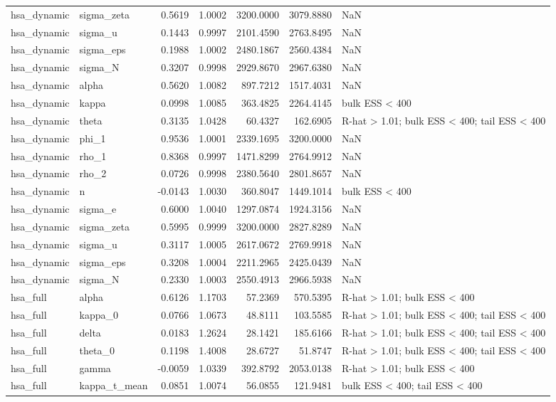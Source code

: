 \begin{tabular}{llrrrrl}
hsa\_dynamic & sigma\_zeta & 0.5619 & 1.0002 & 3200.0000 & 3079.8880 & NaN \\
hsa\_dynamic & sigma\_u & 0.1443 & 0.9997 & 2101.4590 & 2763.8495 & NaN \\
hsa\_dynamic & sigma\_eps & 0.1988 & 1.0002 & 2480.1867 & 2560.4384 & NaN \\
hsa\_dynamic & sigma\_N & 0.3207 & 0.9998 & 2929.8670 & 2967.6380 & NaN \\
hsa\_dynamic & alpha & 0.5620 & 1.0082 & 897.7212 & 1517.4031 & NaN \\
hsa\_dynamic & kappa & 0.0998 & 1.0085 & 363.4825 & 2264.4145 & bulk ESS < 400 \\
hsa\_dynamic & theta & 0.3135 & 1.0428 & 60.4327 & 162.6905 & R-hat > 1.01; bulk ESS < 400; tail ESS < 400 \\
hsa\_dynamic & phi\_1 & 0.9536 & 1.0001 & 2339.1695 & 3200.0000 & NaN \\
hsa\_dynamic & rho\_1 & 0.8368 & 0.9997 & 1471.8299 & 2764.9912 & NaN \\
hsa\_dynamic & rho\_2 & 0.0726 & 0.9998 & 2380.5640 & 2801.8657 & NaN \\
hsa\_dynamic & n & -0.0143 & 1.0030 & 360.8047 & 1449.1014 & bulk ESS < 400 \\
hsa\_dynamic & sigma\_e & 0.6000 & 1.0040 & 1297.0874 & 1924.3156 & NaN \\
hsa\_dynamic & sigma\_zeta & 0.5995 & 0.9999 & 3200.0000 & 2827.8289 & NaN \\
hsa\_dynamic & sigma\_u & 0.3117 & 1.0005 & 2617.0672 & 2769.9918 & NaN \\
hsa\_dynamic & sigma\_eps & 0.3208 & 1.0004 & 2211.2965 & 2425.0439 & NaN \\
hsa\_dynamic & sigma\_N & 0.2330 & 1.0003 & 2550.4913 & 2966.5938 & NaN \\
hsa\_full & alpha & 0.6126 & 1.1703 & 57.2369 & 570.5395 & R-hat > 1.01; bulk ESS < 400 \\
hsa\_full & kappa\_0 & 0.0766 & 1.0673 & 48.8111 & 103.5585 & R-hat > 1.01; bulk ESS < 400; tail ESS < 400 \\
hsa\_full & delta & 0.0183 & 1.2624 & 28.1421 & 185.6166 & R-hat > 1.01; bulk ESS < 400; tail ESS < 400 \\
hsa\_full & theta\_0 & 0.1198 & 1.4008 & 28.6727 & 51.8747 & R-hat > 1.01; bulk ESS < 400; tail ESS < 400 \\
hsa\_full & gamma & -0.0059 & 1.0339 & 392.8792 & 2053.0138 & R-hat > 1.01; bulk ESS < 400 \\
hsa\_full & kappa\_t\_mean & 0.0851 & 1.0074 & 56.0855 & 121.9481 & bulk ESS < 400; tail ESS < 400 \\

\end{tabular}
